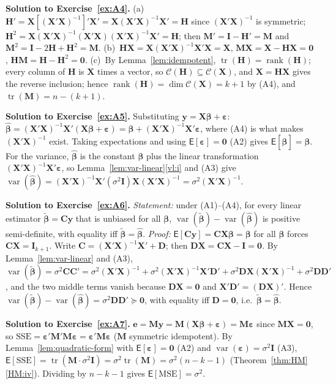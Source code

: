 \documentclass[12pt,a4paper]{article}
\theoremstyle{definition}
\newcommand\expc{\mathsf{E}}
\DeclareMathOperator\var{var}
\DeclareMathOperator\tr{tr}
\DeclareMathOperator\rank{rank}
\newcommand{\SSE}{\mathrm{SSE}}
\newcommand{\MSE}{\mathrm{MSE}}
\newcommand{\bX}{\mathbf{X}}
\newcommand{\by}{\mathbf{y}}
\def\bb{\boldsymbol{\beta}}
\newcommand{\be}{\boldsymbol{\varepsilon}}
\newcommand{\bI}{\mathbf{I}}
\newcommand{\bH}{\mathbf{H}}
\newcommand{\bM}{\mathbf{M}}
\newcommand{\bzero}{\mathbf{0}}
\newcommand{\bC}{\mathbf{C}}
\newcommand{\bD}{\mathbf{D}}
\newcommand{\calC}{\mathcal{C}}
\begin{document}
\textbf{Solution to Exercise~\ref{ex:A4}.} (a)~$\bH' = \bX[(\bX'\bX)^{-1}]'\bX' = \bX(\bX'\bX)^{-1}\bX' = \bH$ since $(\bX'\bX)^{-1}$ is symmetric; $\bH^2 = \bX(\bX'\bX)^{-1}(\bX'\bX)(\bX'\bX)^{-1}\bX' = \bH$; then $\bM' = \bI - \bH' = \bM$ and $\bM^2 = \bI - 2\bH + \bH^2 = \bM$. (b)~$\bH\bX = \bX(\bX'\bX)^{-1}\bX'\bX = \bX$, $\bM\bX = \bX - \bH\bX = \bzero$, $\bH\bM = \bH - \bH^2 = \bzero$. (c)~By Lemma~\ref{lem:idempotent}, $\tr(\bH) = \rank(\bH)$; every column of $\bH$ is $\bX$ times a vector, so $\calC(\bH) \subseteq \calC(\bX)$, and $\bX = \bH\bX$ gives the reverse inclusion; hence $\rank(\bH) = \dim\calC(\bX) = k+1$ by (A4), and $\tr(\bM) = n - (k+1)$.

\textbf{Solution to Exercise~\ref{ex:A5}.} Substituting $\by = \bX\bb + \be$: $\hat{\bb} = (\bX'\bX)^{-1}\bX'(\bX\bb + \be) = \bb + (\bX'\bX)^{-1}\bX'\be$, where (A4) is what makes $(\bX'\bX)^{-1}$ exist. Taking expectations and using $\expc[\be] = \bzero$ (A2) gives $\expc[\hat{\bb}] = \bb$. For the variance, $\hat{\bb}$ is the constant $\bb$ plus the linear transformation $(\bX'\bX)^{-1}\bX'\be$, so Lemma~\ref{lem:var-linear}\ref{vl:i} and (A3) give $\var(\hat{\bb}) = (\bX'\bX)^{-1}\bX'(\sigma^2\bI)\bX(\bX'\bX)^{-1} = \sigma^2(\bX'\bX)^{-1}$.

\textbf{Solution to Exercise~\ref{ex:A6}.} \emph{Statement:} under (A1)--(A4), for every linear estimator $\tilde{\bb} = \bC\by$ that is unbiased for all $\bb$, $\var(\tilde{\bb}) - \var(\hat{\bb})$ is positive semi-definite, with equality iff $\tilde{\bb} = \hat{\bb}$. \emph{Proof:} $\expc[\bC\by] = \bC\bX\bb = \bb$ for all $\bb$ forces $\bC\bX = \bI_{k+1}$. Write $\bC = (\bX'\bX)^{-1}\bX' + \bD$; then $\bD\bX = \bC\bX - \bI = \bzero$. By Lemma~\ref{lem:var-linear} and (A3), $\var(\tilde{\bb}) = \sigma^2\bC\bC' = \sigma^2(\bX'\bX)^{-1} + \sigma^2(\bX'\bX)^{-1}\bX'\bD' + \sigma^2\bD\bX(\bX'\bX)^{-1} + \sigma^2\bD\bD'$, and the two middle terms vanish because $\bD\bX = \bzero$ and $\bX'\bD' = (\bD\bX)'$. Hence $\var(\tilde{\bb}) - \var(\hat{\bb}) = \sigma^2\bD\bD' \succeq \bzero$, with equality iff $\bD = \bzero$, i.e.\ $\tilde{\bb} = \hat{\bb}$.

\textbf{Solution to Exercise~\ref{ex:A7}.} $\mathbf{e} = \bM\by = \bM(\bX\bb + \be) = \bM\be$ since $\bM\bX = \bzero$, so $\SSE = \be'\bM'\bM\be = \be'\bM\be$ ($\bM$ symmetric idempotent). By Lemma~\ref{lem:quadratic-form} with $\expc[\be] = \bzero$ (A2) and $\var(\be) = \sigma^2\bI$ (A3), $\expc[\SSE] = \tr(\bM\cdot\sigma^2\bI) = \sigma^2\tr(\bM) = \sigma^2(n-k-1)$ (Theorem~\ref{thm:HM}\ref{HM:iv}). Dividing by $n-k-1$ gives $\expc[\MSE] = \sigma^2$.
\end{document}
